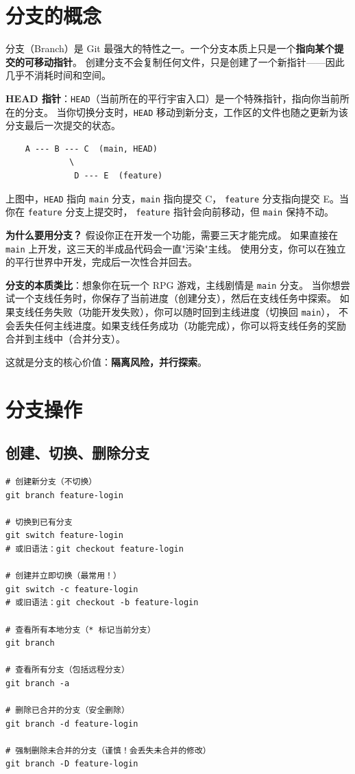 \documentclass[12pt,a4paper,openany]{ctexbook}
\begin{document}
\section{分支的概念}

分支（Branch）是 Git 最强大的特性之一。一个分支本质上只是一个\textbf{指向某个提交的可移动指针}。
创建分支不会复制任何文件，只是创建了一个新指针——因此几乎不消耗时间和空间。

\medskip
\textbf{HEAD 指针}：\texttt{HEAD}（当前所在的平行宇宙入口）是一个特殊指针，指向你当前所在的分支。
当你切换分支时，\texttt{HEAD} 移动到新分支，工作区的文件也随之更新为该分支最后一次提交的状态。

\begin{verbatim}
    A --- B --- C  (main, HEAD)
             \
              D --- E  (feature)
\end{verbatim}

上图中，\texttt{HEAD} 指向 \texttt{main} 分支，\texttt{main} 指向提交 C，
\texttt{feature} 分支指向提交 E。当你在 \texttt{feature} 分支上提交时，
\texttt{feature} 指针会向前移动，但 \texttt{main} 保持不动。
\medskip

\textbf{为什么要用分支？} 假设你正在开发一个功能，需要三天才能完成。
如果直接在 \texttt{main} 上开发，这三天的半成品代码会一直"污染"主线。
使用分支，你可以在独立的平行世界中开发，完成后一次性合并回去。

\medskip
\textbf{分支的本质类比}：想象你在玩一个 RPG 游戏，主线剧情是 \texttt{main} 分支。
当你想尝试一个支线任务时，你保存了当前进度（创建分支），然后在支线任务中探索。
如果支线任务失败（功能开发失败），你可以随时回到主线进度（切换回 \texttt{main}），
不会丢失任何主线进度。如果支线任务成功（功能完成），你可以将支线任务的奖励合并到主线中（合并分支）。

这就是分支的核心价值：\textbf{隔离风险，并行探索}。
\medskip

\section{分支操作}

\subsection{创建、切换、删除分支}

\begin{lstlisting}[style=shell]
# 创建新分支（不切换）
git branch feature-login

# 切换到已有分支
git switch feature-login
# 或旧语法：git checkout feature-login

# 创建并立即切换（最常用！）
git switch -c feature-login
# 或旧语法：git checkout -b feature-login

# 查看所有本地分支（* 标记当前分支）
git branch

# 查看所有分支（包括远程分支）
git branch -a

# 删除已合并的分支（安全删除）
git branch -d feature-login

# 强制删除未合并的分支（谨慎！会丢失未合并的修改）
git branch -D feature-login
\end{lstlisting}
\end{document}
